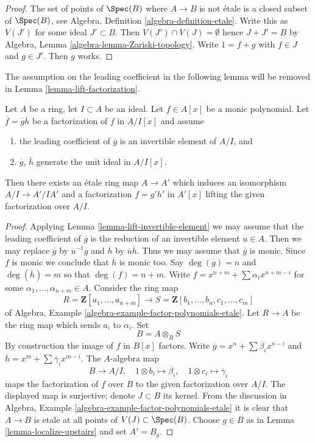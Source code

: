 \begin{proof}
The set of points of $\Spec(B)$ where $A \to B$ is not \'etale is a
closed subset of $\Spec(B)$, see
Algebra, Definition \ref{algebra-definition-etale}.
Write this as $V(J')$ for some ideal $J' \subset B$. Then
$V(J') \cap V(J) = \emptyset$ hence $J + J' = B$ by
Algebra, Lemma \ref{algebra-lemma-Zariski-topology}.
Write $1 = f + g$ with $f \in J$ and $g \in J'$.
Then $g$ works.
\end{proof}

\noindent
The assumption on the leading coefficient in the following lemma
will be removed in Lemma \ref{lemma-lift-factorization}.

\begin{lemma}
\label{lemma-lift-factorization-easy}
Let $A$ be a ring, let $I \subset A$ be an ideal. Let $f \in A[x]$ be a
monic polynomial. Let $\overline{f} = \overline{g} \overline{h}$ be a
factorization of $f$ in $A/I[x]$ and assume
\begin{enumerate}
\item the leading coefficient of $\overline{g}$ is an invertible element
of $A/I$, and
\item $\overline{g}$, $\overline{h}$ generate the unit ideal in $A/I[x]$.
\end{enumerate}
Then there exists an \'etale ring map $A \to A'$ which induces an
isomorphism $A/I \to A'/IA'$ and a factorization $f = g' h'$ in $A'[x]$
lifting the given factorization over $A/I$.
\end{lemma}

\begin{proof}
Applying Lemma \ref{lemma-lift-invertible-element} we may assume that
the leading coefficient of $\overline{g}$ is the reduction of an
invertible element $u \in A$. Then we may replace $\overline{g}$ by
$\overline{u}^{-1}\overline{g}$ and $\overline{h}$ by
$\overline{u}\overline{h}$. Thus we may assume that $\overline{g}$
is monic. Since $f$ is monic we conclude that $\overline{h}$ is monic
too. Say $\deg(\overline{g}) = n$ and $\deg(\overline{h}) = m$ so
that $\deg(f) = n + m$. Write $f = x^{n + m} + \sum \alpha_i x^{n + m - i}$
for some $\alpha_1, \ldots, \alpha_{n + m} \in A$. Consider the ring map
$$
R = \mathbf{Z}[a_1, \ldots, a_{n + m}]
\longrightarrow
S = \mathbf{Z}[b_1, \ldots, b_n, c_1, \ldots, c_m]
$$
of Algebra, Example \ref{algebra-example-factor-polynomials-etale}.
Let $R \to A$ be the ring map which sends $a_i$ to $\alpha_i$.
Set
$$
B = A \otimes_R S
$$
By construction the image of $f$ in $B[x]$ factors.
Write $\overline{g} = x^n + \sum \overline{\beta}_i x^{n - i}$ and
$\overline{h} = x^m + \sum \overline{\gamma}_i x^{m - i}$.
The $A$-algebra map
$$
B \longrightarrow A/I, \quad
1 \otimes b_i \mapsto \overline{\beta}_i, \quad
1 \otimes c_i \mapsto \overline{\gamma}_i
$$
maps the factorization of $f$ over $B$ to the given factorization over
$A/I$. The displayed map is surjective; denote $J \subset B$ its kernel.
From the discussion in 
Algebra, Example \ref{algebra-example-factor-polynomials-etale}
it is clear that $A \to B$ is etale at all points of $V(J) \subset \Spec(B)$.
Choose $g \in B$ as in Lemma \ref{lemma-localize-upstairs} and
set $A' = B_g$.
\end{proof}


